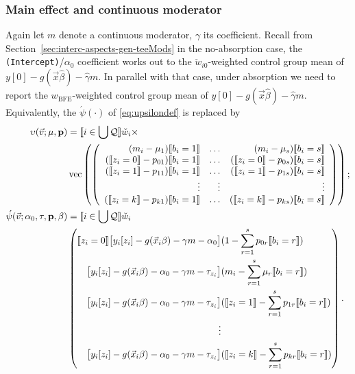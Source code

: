 \documentclass{article}
\DeclarePairedDelimiter{\indicator}{\llbracket}{\rrbracket}
\newcommand{\owt}[1][{[z_{i}]}]{\ensuremath{\check{w}_{i#1}}}
\newcommand{\absorbInterceptsEF}{\upsilon}
\begin{document}
\subsubsection{Main effect and continuous moderator}
Again let $m$ denote a continuous moderator, $\gamma$ its
coefficient. Recall from Section~\ref{sec:interc-aspects-gen-teeMods} in the no-absorption case, the \texttt{(Intercept)}/$\alpha_{0}$
coefficient works out to the $\owt[0]$-weighted control group mean of $y[0] - g(\vec{x}\hat\beta) -
\hat{\gamma}m$. In parallel with that case, under absorption we need to report the  $w_{\text{BFE}}$-weighted control group mean of $y[0] - g(\vec{x}\hat\beta) -
\hat{\gamma}m$. Equivalently, the $\acute{\psi}(\cdot)$ of
\eqref{eq:upsilondef} is replaced by
\begin{align}
    \absorbInterceptsEF(\vec{v}; \mu, \mathbf{p}) &=
                                             \indicator{i \in \bigcup \mathcal{Q}} \owt[] \times \nonumber \\
  &\operatorname{vec}\left(%
    \left(
    \begin{array}{rrr}
      (m_{i} - \mu_{1}) \indicator{b_{i}=1} & \ldots & 
(m_{i} - \mu_{s}) \indicator{b_{i}=s} \\
      (\indicator{z_{i}=0}-p_{01})\indicator{b_{i}=1}
      &\ldots
      &
        (\indicator{z_{i}=0}-p_{0s})\indicator{b_{i}=s}
      \\
      (\indicator{z_{i}=1}-p_{11})\indicator{b_{i}=1}
      &\ldots
      &
        (\indicator{z_{i}=1}-p_{1s})\indicator{b_{i}=s}
      \\
      \vdots & \vdots & \vdots \\
      (\indicator{z_{i}=k}-p_{k1})\indicator{b_{i}=1}
      &\ldots
      &
        (\indicator{z_{i}=k}-p_{ks})\indicator{b_{i}=s}\\                                      \end{array}
  \right)%
  \right) ;\nonumber \\
    \acute{\psi}(\vec{v}; \alpha_{0}, \tau, \mathbf{p}, \beta) &=
    \indicator{i \in \bigcup \mathcal{Q}}\owt[] \nonumber
  \\
&\left(
  \begin{aligned}                                               
    \indicator{z_{i}=0} \big[y_{i}[z_{i}]
    -
    g(\vec{x}_{i}\beta) - {\gamma}m-\alpha_{0}\big]
    &(
   1 - \sum_{r=1}^{s}p_{0r}\indicator{b_{i}=r}) \\
\big[y_{i}[z_{i}]
    -
    g(\vec{x}_{i}\beta)-\alpha_{0}- {\gamma}m-\tau_{z_{i}}\big]
    &(m_{i} - \sum_{r=1}^{s}\mu_{r}\indicator{b_{i}=r})
    \\
   \big[y_{i}[z_{i}]
    -
    g(\vec{x}_{i}\beta)-\alpha_{0}- {\gamma}m-\tau_{z_{i}}\big]
    &(
    \indicator{z_{i}=1} - \sum_{r=1}^{s}p_{1r}\indicator{b_{i}=r})\\
    \vdots \\
    {}\big[y_{i}[z_{i}]
    - g(\vec{x}_{i}\beta) - \alpha_{0}- {\gamma}m -
    \tau_{z_{i}}\big]
    &(\indicator{z_{i}=k}
    - \sum_{r=1}^{s}p_{kr}\indicator{b_{i}=r})\\
  \end{aligned}
\right) .\label{eq:30}
\end{align}
\end{document}
